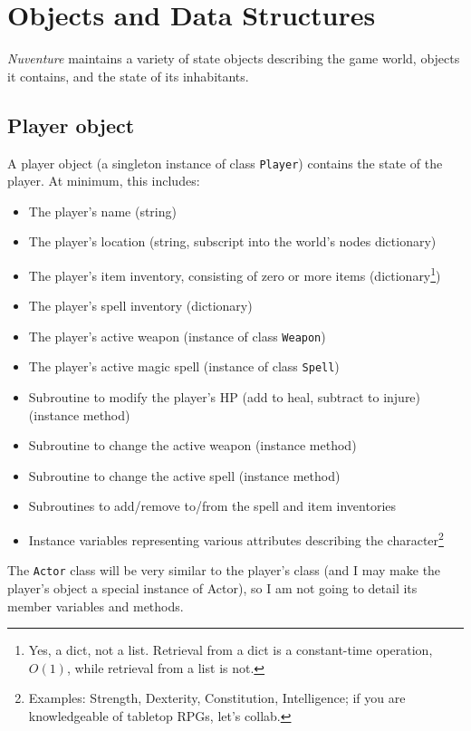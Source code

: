 \documentclass[11pt,letterpaper]{article}
\begin{document}
\section{Objects and Data Structures}

 {\it Nuventure} maintains a variety of state objects describing the game world, objects it contains, and the state of its inhabitants.

\subsection{Player object}

A player object (a singleton instance of class {\tt Player}) contains the state of the player.  At minimum, this includes:

\begin{itemize}
    \item The player's name (string)
    \item The player's location (string, subscript into the world's nodes dictionary)
    \item The player's item inventory, consisting of zero or more items (dictionary\footnote{Yes, a dict, not a list.  Retrieval from a dict is a constant-time operation, $O(1)$, while retrieval from a list is not.})
    \item The player's spell inventory (dictionary)
    \item The player's active weapon (instance of class {\tt Weapon})
    \item The player's active magic spell (instance of class {\tt Spell})
    \item Subroutine to modify the player's HP (add to heal, subtract to injure) (instance method)
    \item Subroutine to change the active weapon (instance method)
    \item Subroutine to change the active spell (instance method)
    \item Subroutines to add/remove to/from the spell and item inventories
    \item Instance variables representing various attributes describing the character\footnote{Examples: Strength, Dexterity, Constitution, Intelligence; if you are knowledgeable of tabletop RPGs, let's collab.}
\end{itemize}

The {\tt Actor} class will be very similar to the player's class (and I may make the player's object a special instance of Actor), so I am not going to detail its member variables and methods.
\end{document}
